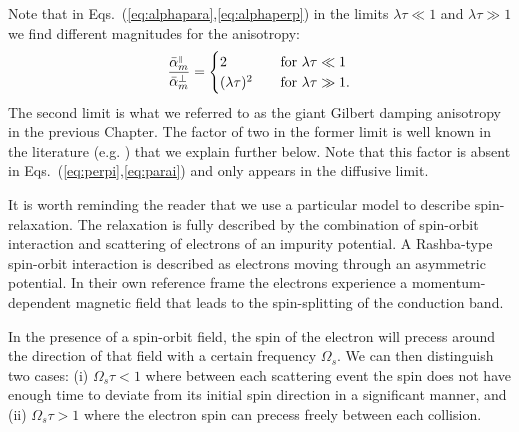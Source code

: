 Note that in Eqs.~(\ref{eq:alphapara},\ref{eq:alphaperp}) in the limits $\lambda\tau\ll 1$ and $\lambda\tau\gg1$ we find different magnitudes for the anisotropy:
\begin{equation}
	\frac{\bar{\alpha}_m^{{\scriptscriptstyle\parallel}}}{\bar{\alpha}_m^{\perp}} = \begin{cases}
    	2 
        	& \quad \text{for } \lambda\tau\ll 1\\
        (\lambda\tau)^2
        	& \quad \text{for } \lambda\tau\gg 1.
    \end{cases}
\end{equation}
The second limit is what we referred to as the giant Gilbert damping anisotropy in the previous Chapter. The factor of two in the former limit is well known in the literature (e.g. \cite{DYAKONOV1986, aronov_spin_1983, averkiev_spin_2002, burkov_theory_2004}) that we explain further below. Note that this factor is absent in Eqs.~(\ref{eq:perpi},\ref{eq:parai}) and only appears in the diffusive limit. 

It is worth reminding the reader that we use a particular model to describe spin-relaxation. The relaxation is fully described by the combination of spin-orbit interaction and scattering of electrons of an impurity potential. A Rashba-type spin-orbit interaction is described as electrons moving through an asymmetric potential. In their own reference frame the electrons experience a momentum-dependent magnetic field that leads to the spin-splitting of the conduction band. 

In the presence of a spin-orbit field, the spin of the electron will precess around the direction of that field with a certain frequency $\Omega_s$. We can then distinguish two cases: (i) $\Omega_s \tau < 1$ where between each scattering event the spin does not have enough time to deviate from its initial spin direction in a significant manner, and (ii) $\Omega_s\tau>1$ where the electron spin can precess freely between each collision. 

